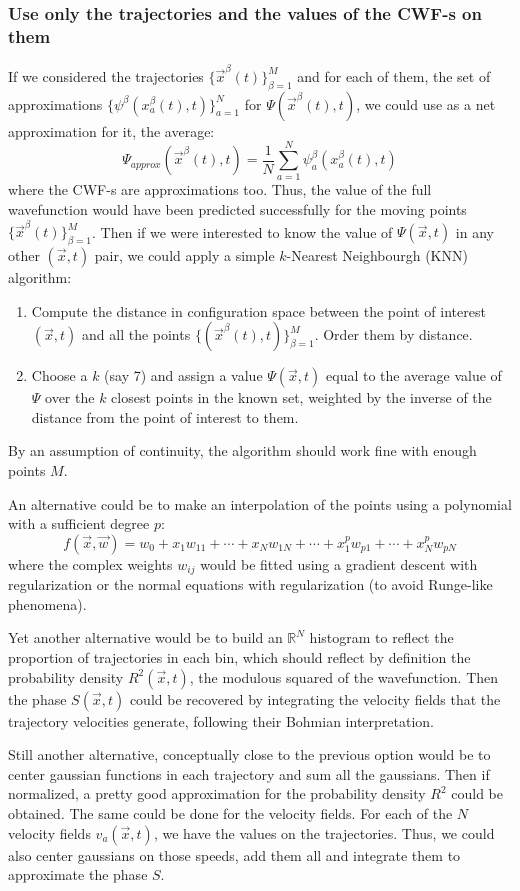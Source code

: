 \documentclass[11pt, a4paper]{article} %
\newcommand{\R}{\mathbb{R}} %
\begin{document}
\subsubsection{Use only the trajectories and the values of the CWF-s on them}
If we considered the trajectories $\{\vec{x}^\beta(t)\}_{\beta=1}^M$ and for each of them, the set of approximations $\{\psi^\beta(x_a^\beta(t),t) \}_{a=1}^{N}$ for $\Psi(\vec{x}^\beta(t),t)$, we could use as a net approximation for it, the average:
$$
\Psi_{approx}(\vec{x}^\beta(t),t)=\frac{1}{N}\sum_{a=1}^N \psi^\beta_a(x_a^\beta(t),t)
$$
where the CWF-s are approximations too. Thus, the value of the full wavefunction would have been predicted successfully for the moving points $\{ \vec{x}^\beta(t) \}_{\beta=1}^M$. Then if we were interested to know the value of $\Psi(\vec{x},t)$ in any other $(\vec{x},t)$ pair, we could apply a simple $k$-Nearest Neighbourgh (KNN) algorithm:
\begin{enumerate}
\item Compute the distance in configuration space between the point of interest $(\vec{x},t)$ and all the points $\{ (\vec{x}^\beta(t),t) \}_{\beta=1}^M$. Order them by distance.
\item Choose a $k$ (say 7) and assign a value $\Psi(\vec{x},t)$ equal to the average value of $\Psi$ over the $k$ closest points in the known set, weighted by the inverse of the distance from the point of interest to them.
\end{enumerate}

By an assumption of continuity, the algorithm should work fine with enough points $M$.

An alternative could be to make an interpolation of the points using a polynomial with a sufficient degree $p$: $$f(\vec{x},\vec{w})=w_0+x_1w_{11}+\cdots+x_Nw_{1N}+\cdots+x_1^pw_{p1}+\cdots+x_N^pw_{pN}$$
where the complex weights $w_{ij}$ would be fitted using a gradient descent with regularization or the normal equations with regularization (to avoid Runge-like phenomena).


Yet another alternative would be to build an $\R^N$ histogram to reflect the proportion of trajectories in each bin, which should reflect by definition the probability density $R^2(\vec{x},t)$, the modulous squared of the wavefunction. Then the phase $S(\vec{x},t)$ could be recovered by integrating the velocity fields that the trajectory velocities generate, following their Bohmian interpretation.


Still another alternative, conceptually close to the previous option would be to center gaussian functions in each trajectory and sum all the gaussians. Then if normalized, a pretty good approximation for the probability density $R^2$ could be obtained. The same could be done for the velocity fields. For each of the $N$ velocity fields $v_a(\vec{x},t)$, we have the values on the trajectories. Thus, we could also center gaussians on those speeds, add them all and integrate them to approximate the phase $S$.
\end{document}
